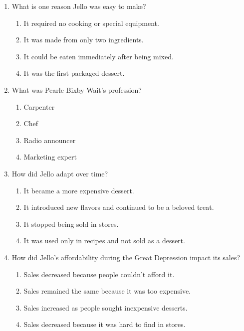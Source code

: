 \documentclass[12pt]{article}
\begin{document}
\begin{enumerate}
\vspace{0.5cm}

\item What is one reason Jello was easy to make?
\begin{enumerate}[label=\Alph*.]
    \item It required no cooking or special equipment.
    \item It was made from only two ingredients.
    \item It could be eaten immediately after being mixed.
    \item It was the first packaged dessert.
\end{enumerate}

\vspace{0.5cm}

\item What was Pearle Bixby Wait’s profession?
\begin{enumerate}[label=\Alph*.]
    \item Carpenter
    \item Chef
    \item Radio announcer
    \item Marketing expert
\end{enumerate}

\vspace{0.5cm}

\item How did Jello adapt over time?
\begin{enumerate}[label=\Alph*.]
    \item It became a more expensive dessert.
    \item It introduced new flavors and continued to be a beloved treat.
    \item It stopped being sold in stores.
    \item It was used only in recipes and not sold as a dessert.
\end{enumerate}

\vspace{0.5cm}

\item How did Jello’s affordability during the Great Depression impact its sales?
\begin{enumerate}[label=\Alph*.]
    \item Sales decreased because people couldn’t afford it.
    \item Sales remained the same because it was too expensive.
    \item Sales increased as people sought inexpensive desserts.
    \item Sales decreased because it was hard to find in stores.
\end{enumerate}


\end{enumerate}
\end{document}
